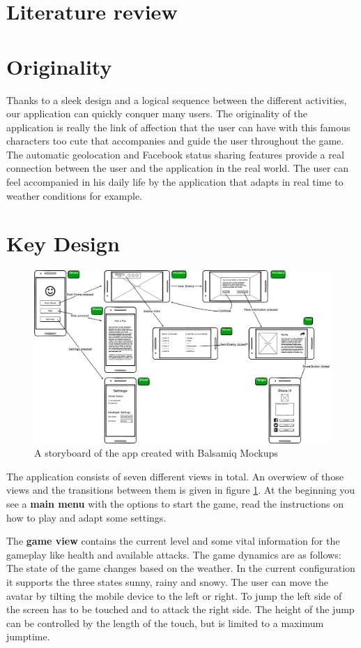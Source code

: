 \documentclass{sigchi}
\begin{document}
\section{Literature review}
\section{Originality}
Thanks to a sleek design and a logical sequence between the different activities, our application can quickly conquer many users. The originality of the application is really the link of affection that the user can have with this famous characters too cute that accompanies and guide the user throughout the game. The automatic geolocation and Facebook status sharing features provide a real connection between the user and the application in the real world. The user can feel accompanied in his daily life by the application that adapts in real time to weather conditions for example.
\section{Key Design}
\begin{figure}
\label{fig:storyboard}
	\centering
	\includegraphics[width=7in]{figures/UIDesign/Storyboard.png}
	\caption{A storyboard of the app created with Balsamiq Mockups}
\end{figure}
The application consists of seven different views in total. An overwiew of those views and the transitions between them is given in figure \ref{fig:storyboard}. At the beginning you see a \textbf{main menu} with the options to start the game, read the instructions on how to play and adapt some settings.

The \textbf{game view} contains the current level and some vital information for the gameplay like health and available attacks. The game dynamics are as follows: The state of the game changes based on the weather. In the current configuration it supports the three states sunny, rainy and snowy. The user can move the avatar by tilting the mobile device to the left or right. To jump the left side of the screen has to be touched and to attack the right side. The height of the jump can be controlled by the length of the touch, but is limited to a maximum jumptime.
\end{document}
